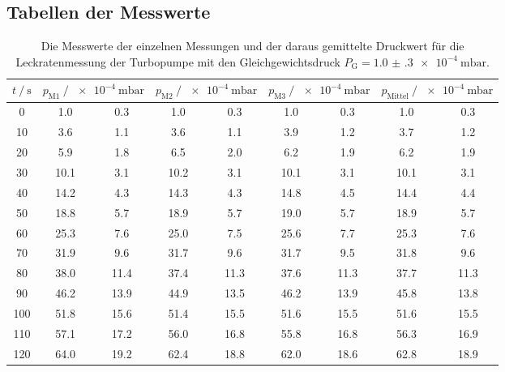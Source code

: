 \subsection{Tabellen der Messwerte}

\begin{table}[h]
    \centering
    \caption{Die Messwerte der einzelnen Messungen und der daraus gemittelte Druckwert für die Leckratenmessung 
    der Turbopumpe mit den Gleichgewichtsdruck $P_\text{G} = \SI{1.0(3)e-4}{\milli\bar}$.}
    \label{tab:turbo_leck_1}
    \begin{tabular}{S[table-format=3.0] S @{${}\pm{}$} S S @{${}\pm{}$} S S @{${}\pm{}$} S S @{${}\pm{}$} S}
    \toprule
    {$t \mathbin{/} \si{\second} $} &  &  &  &  \\
       &  1.0 &  0.3 &  1.0 &  0.3 &  1.0 &  0.3 &  1.0 &  0.3 \\
    10  &  3.6 &  1.1 &  3.6 &  1.1 &  3.9 &  1.2 &  3.7 &  1.2 \\
    20  &  5.9 &  1.8 &  6.5 &  2.0 &  6.2 &  1.9 &  6.2 &  1.9 \\
    30  & 10.1 &  3.1 & 10.2 &  3.1 & 10.1 &  3.1 & 10.1 &  3.1 \\
    40  & 14.2 &  4.3 & 14.3 &  4.3 & 14.8 &  4.5 & 14.4 &  4.4 \\
    50  & 18.8 &  5.7 & 18.9 &  5.7 & 19.0 &  5.7 & 18.9 &  5.7 \\
    60  & 25.3 &  7.6 & 25.0 &  7.5 & 25.6 &  7.7 & 25.3 &  7.6 \\
    70  & 31.9 &  9.6 & 31.7 &  9.6 & 31.7 &  9.5 & 31.8 &  9.6 \\
    80  & 38.0 & 11.4 & 37.4 & 11.3 & 37.6 & 11.3 & 37.7 & 11.3 \\
    90  & 46.2 & 13.9 & 44.9 & 13.5 & 46.2 & 13.9 & 45.8 & 13.8 \\
    100 & 51.8 & 15.6 & 51.4 & 15.5 & 51.6 & 15.5 & 51.6 & 15.5 \\
    110 & 57.1 & 17.2 & 56.0 & 16.8 & 55.8 & 16.8 & 56.3 & 16.9 \\
    120 & 64.0 & 19.2 & 62.4 & 18.8 & 62.0 & 18.6 & 62.8 & 18.9 \\
    \bottomrule
    \end{tabular}
  \end{table}

